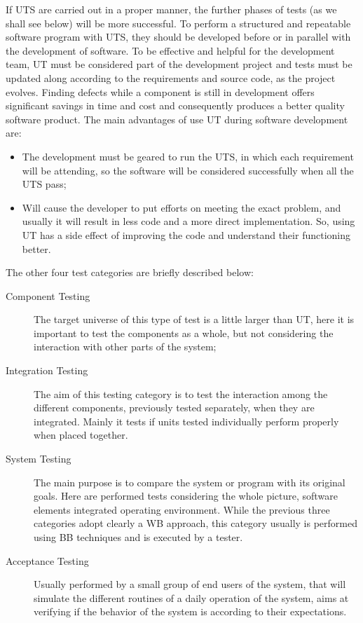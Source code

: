 {If \ac{UTS} are carried out in a proper manner, the further phases of tests (as we shall see below) will be more successful.
To perform a structured and repeatable software program with \ac{UTS}, they should be developed before or in parallel with the development of software.
To be effective and helpful for the development team, \ac{UT} must be considered part of the development project
and tests must be updated along according to the requirements and source code, as the project evolves\cite{dustin2002effective}.
Finding defects while a component is still in development offers significant savings in time and cost and consequently produces a better quality software product.
The main advantages of use \ac{UT} during software development are\cite{dustin2002effective}:
\begin{itemize}
\item The development must be geared to run the \ac{UTS}, in which each requirement will be attending, so the software will be considered
successfully when all the \ac{UTS} pass;
\item Will cause the developer to put efforts on meeting the exact problem, and usually it will result in less code and a more direct implementation.
So, using \ac{UT} has a side effect of improving the code and understand their functioning better.
\end{itemize}

The other four test categories are briefly described below:

\begin{description}
\item[Component Testing] The target universe of this type of test is a little larger than \ac{UT},
here it is important to test the components as a whole, but not considering the interaction with other parts of the system;
\item[Integration Testing] The aim of this testing category is to
test the interaction among the different components, previously tested separately, when they are integrated.
Mainly it tests if units tested individually perform properly when placed together.
\item[System Testing]
The main purpose is to compare the system or program with its original goals.
Here are performed tests considering the whole picture, software elements integrated operating environment.
While the previous three categories adopt clearly a \ac{WB} approach, this category usually is performed using \ac{BB}
techniques and is executed by a tester.
\item[Acceptance Testing] Usually performed by a small group of end users of the system, that will simulate the
different routines of a daily  operation of the system, aims
at verifying if the behavior of the system is according to their expectations.
\end{description}

}
